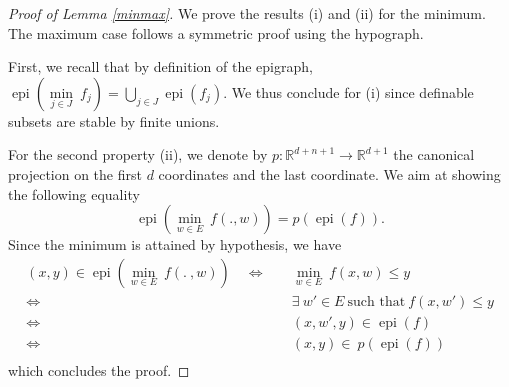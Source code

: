 \documentclass[11pt]{article}
\DeclareMathOperator{\epi}{epi}
\newcommand{\1}{\mathbbm{1}}
\numberwithin{equation}{section}
\begin{document}
\begin{proof}[Proof of Lemma \ref{minmax}]

We prove the results (i) and (ii) for the minimum. The maximum case follows a symmetric proof using the hypograph.

First, we recall that by definition of the epigraph, $\epi \left( \underset{j\in J }{\min} \:f_{j}\right)=\bigcup_{j\in J}\epi(f_{j})$. We thus conclude for (i) since definable subsets are stable by finite unions.

For the second property (ii), we denote by $p:\mathbb{R}^{d+n+1}\longrightarrow \mathbb{R}^{d+1}$ the canonical projection on the first $d$ coordinates and the last coordinate. We aim at showing the following equality
\begin{equation*}
\epi\left(\underset{w\in E}{\min}\:f(.,w)\right)=p\left(\epi(f)\right).
\end{equation*}
Since the minimum is attained by hypothesis, we have
\begin{align*}
(x,y)\in \epi\left(\underset{w\in E}{\min}\: f(.\:,w)\right)
\quad\iff \quad & \underset{w\in E}{\min}\:f(x,w)\leq y\\
\iff \quad & \exists \ w'\in E\ \text{such that}\ f(x,w')\leq y\\
\iff \quad & (x,w',y)\in \epi(f)\\
\iff \quad & (x,y)\in \ p(\epi(f))\\
\end{align*}
which concludes the proof.

\end{proof}





\end{document}
